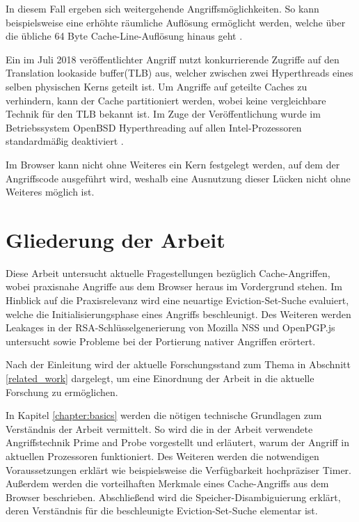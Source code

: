 In diesem Fall ergeben sich weitergehende Angriffsmöglichkeiten.
So kann beispielsweise eine erhöhte räumliche Auflösung ermöglicht werden, welche über die übliche 64 Byte Cache-Line-Auflösung hinaus geht \cite{MemJam}.

Ein im Juli 2018 veröffentlichter Angriff \cite{TLBleed} nutzt konkurrierende Zugriffe auf den Translation lookaside buffer(TLB) aus, welcher zwischen zwei Hyperthreads eines selben physischen Kerns geteilt ist.
Um Angriffe auf geteilte Caches zu verhindern, kann der Cache partitioniert werden, wobei keine vergleichbare Technik für den TLB bekannt ist.
Im Zuge der Veröffentlichung wurde im Betriebssystem OpenBSD Hyperthreading auf allen Intel-Prozessoren standardmäßig deaktiviert \cite{OpenBSDHyperthreading}.

Im Browser kann nicht ohne Weiteres ein Kern festgelegt werden, auf dem der Angriffscode ausgeführt wird, weshalb eine Ausnutzung dieser Lücken nicht ohne Weiteres möglich ist.

\section{Gliederung der Arbeit}

Diese Arbeit untersucht aktuelle Fragestellungen bezüglich Cache-Angriffen, wobei praxisnahe Angriffe aus dem Browser heraus im Vordergrund stehen.
Im Hinblick auf die Praxisrelevanz wird eine neuartige Eviction-Set-Suche evaluiert, welche die Initialisierungsphase eines Angriffs beschleunigt.
Des Weiteren werden Leakages in der RSA-Schlüsselgenerierung von Mozilla NSS und OpenPGP.js untersucht sowie Probleme bei der Portierung nativer Angriffen erörtert.

\par \medskip                         

Nach der Einleitung wird der aktuelle Forschungsstand zum Thema in Abschnitt \ref{related_work} dargelegt, um eine Einordnung der Arbeit in die aktuelle Forschung zu ermöglichen.

\par \medskip                     

In Kapitel \ref{chapter:basics} werden die nötigen technische Grundlagen zum Verständnis der Arbeit vermittelt.
So wird die in der Arbeit verwendete Angriffstechnik Prime and Probe vorgestellt und erläutert, warum der Angriff in aktuellen Prozessoren funktioniert.
Des Weiteren werden die notwendigen Voraussetzungen erklärt wie beispielsweise die Verfügbarkeit hochpräziser Timer.
Außerdem werden die vorteilhaften Merkmale eines Cache-Angriffs aus dem Browser beschrieben.
Abschließend wird die Speicher-Disambiguierung erklärt, deren Verständnis für die beschleunigte Eviction-Set-Suche elementar ist.

